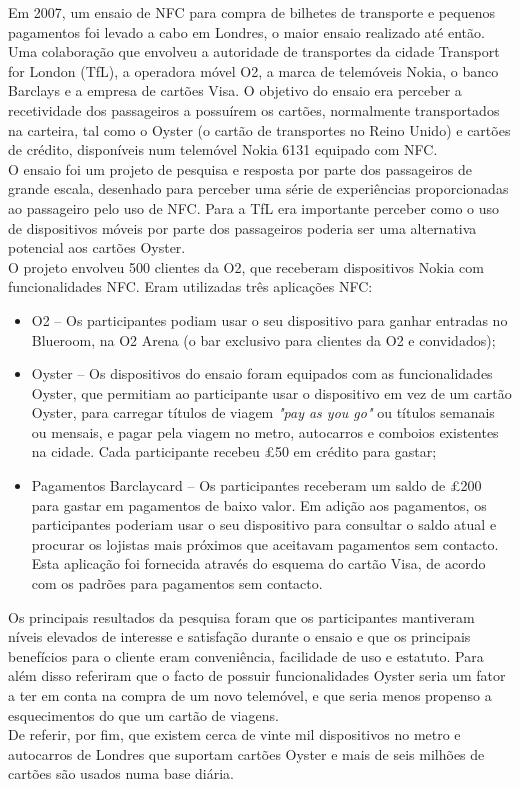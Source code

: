 Em 2007, um ensaio de NFC para compra de bilhetes de transporte e pequenos pagamentos foi levado a cabo em Londres, o maior ensaio realizado até então. Uma colaboração que envolveu a autoridade de transportes da cidade Transport for London (TfL), a operadora móvel O2, a marca de telemóveis Nokia, o banco Barclays e a empresa de cartões Visa. O objetivo do ensaio era perceber a recetividade dos passageiros a possuírem os cartões, normalmente transportados na carteira, tal como o Oyster (o cartão de transportes no Reino Unido) e cartões de crédito, disponíveis num telemóvel Nokia 6131 equipado com NFC.
\\O ensaio foi um projeto de pesquisa e resposta por parte dos passageiros de grande escala, desenhado para perceber uma série de experiências proporcionadas ao passageiro pelo uso de NFC. Para a TfL era importante perceber como o uso de dispositivos móveis por parte dos passageiros poderia ser uma alternativa potencial aos cartões Oyster.
\\O projeto envolveu 500 clientes da O2, que receberam dispositivos Nokia com funcionalidades NFC. Eram utilizadas três aplicações NFC:
\begin{itemize}
\item O2 – Os participantes podiam usar o seu dispositivo para ganhar entradas no Blueroom, na O2 Arena (o bar exclusivo para clientes da O2 e convidados);
\item Oyster – Os dispositivos do ensaio foram equipados com as funcionalidades Oyster, que permitiam ao participante usar o dispositivo em vez de um cartão Oyster, para carregar títulos de viagem \textit{"pay as you go"} ou títulos semanais ou mensais, e pagar pela viagem no metro, autocarros e comboios existentes na cidade. Cada participante recebeu £50 em crédito para gastar;
\item Pagamentos Barclaycard – Os participantes receberam um saldo de £200 para gastar em pagamentos de baixo valor. Em adição aos pagamentos, os participantes poderiam usar o seu dispositivo para consultar o saldo atual e procurar os lojistas mais próximos que aceitavam pagamentos sem contacto. Esta aplicação foi fornecida através do esquema do cartão Visa, de acordo com os padrões para pagamentos sem contacto.
\end{itemize}
Os principais resultados da pesquisa foram que os participantes mantiveram níveis elevados de interesse e satisfação durante o ensaio e que os principais benefícios para o cliente eram conveniência, facilidade de uso e estatuto.\cite{NFCForum2011} Para além disso referiram que o facto de possuir funcionalidades Oyster seria um fator a ter em conta na compra de um novo telemóvel, e que seria menos propenso a esquecimentos do que um cartão de viagens.
\\De referir, por fim, que existem cerca de vinte mil dispositivos no metro e autocarros de Londres que suportam cartões Oyster e mais de seis milhões de cartões são usados numa base diária.\cite{DeKozan2009} \cite{Mezghani2008}

